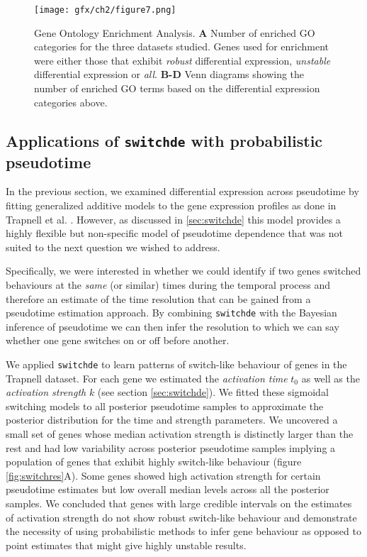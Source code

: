 \begin{figure}
\centering
	\texttt{[image: gfx/ch2/figure7.png]}
\caption[Gene Ontology Enrichment Analysis.]{ Gene Ontology Enrichment Analysis.
\textbf{A} Number of enriched GO categories for the three datasets studied. Genes used for enrichment were either those that exhibit \emph{robust} differential expression, \emph{unstable} differential expression or \emph{all}.
\textbf{B-D} Venn diagrams showing the number of enriched GO terms based on the differential expression categories above.} \label{fig:go_enrichment}
\end{figure}


\subsection{Applications of \texttt{switchde} with probabilistic pseudotime}

In the previous section, we examined differential expression across pseudotime by fitting generalized additive models to the gene expression profiles as done in Trapnell et al. \cite{Trapnell2014-xi}.  However, as discussed in \ref{sec:switchde} this model provides a highly flexible but non-specific model of pseudotime dependence that was not suited to the next question we wished to address.

Specifically, we were interested in whether we could identify if two genes switched behaviours at the \emph{same} (or similar) times during the temporal process and therefore an estimate of the time resolution that can be gained from a pseudotime estimation approach. By combining \texttt{switchde} with the Bayesian inference of pseudotime we can then infer the resolution to which we can say whether one gene switches on or off before another.

We applied \texttt{switchde} to learn patterns of switch-like behaviour of genes in the Trapnell dataset. For each gene we estimated the \emph{activation time} $t_0$ as well as the \emph{activation strength} $k$ (see section \ref{sec:switchde}). We fitted these sigmoidal switching models to all posterior pseudotime samples to approximate the posterior distribution for the time and strength parameters. We uncovered a small set of genes whose median activation strength is distinctly larger than the rest and had low variability across posterior pseudotime samples implying a population of genes that exhibit highly switch-like behaviour (figure \ref{fig:switchres}A). Some genes showed high activation strength for certain pseudotime estimates but low overall median levels across all the posterior samples. We concluded that genes with large credible intervals on the estimates of activation strength do not show robust switch-like behaviour and demonstrate the necessity of using probabilistic methods to infer gene behaviour as opposed to point estimates that might give highly unstable results.

